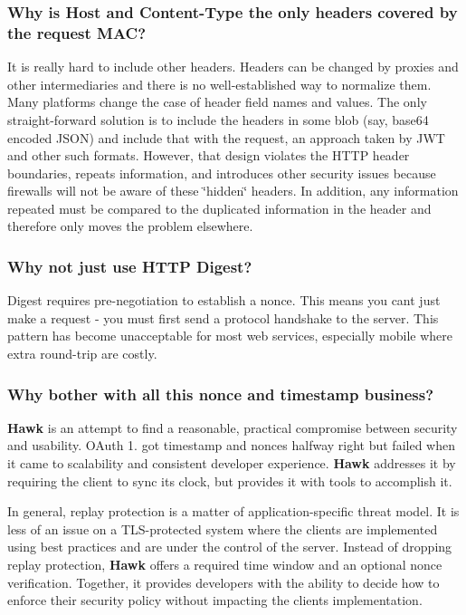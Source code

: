 \subsubsection*{Why is Host and Content-\/\+Type the only headers covered by the request M\+AC?}

It is really hard to include other headers. Headers can be changed by proxies and other intermediaries and there is no well-\/established way to normalize them. Many platforms change the case of header field names and values. The only straight-\/forward solution is to include the headers in some blob (say, base64 encoded J\+S\+ON) and include that with the request, an approach taken by J\+WT and other such formats. However, that design violates the H\+T\+TP header boundaries, repeats information, and introduces other security issues because firewalls will not be aware of these \char`\"{}hidden\char`\"{} headers. In addition, any information repeated must be compared to the duplicated information in the header and therefore only moves the problem elsewhere.

\subsubsection*{Why not just use H\+T\+TP Digest?}

Digest requires pre-\/negotiation to establish a nonce. This means you can\textquotesingle{}t just make a request -\/ you must first send a protocol handshake to the server. This pattern has become unacceptable for most web services, especially mobile where extra round-\/trip are costly.

\subsubsection*{Why bother with all this nonce and timestamp business?}

{\bfseries Hawk} is an attempt to find a reasonable, practical compromise between security and usability. O\+Auth 1. got timestamp and nonces halfway right but failed when it came to scalability and consistent developer experience. {\bfseries Hawk} addresses it by requiring the client to sync its clock, but provides it with tools to accomplish it.

In general, replay protection is a matter of application-\/specific threat model. It is less of an issue on a T\+L\+S-\/protected system where the clients are implemented using best practices and are under the control of the server. Instead of dropping replay protection, {\bfseries Hawk} offers a required time window and an optional nonce verification. Together, it provides developers with the ability to decide how to enforce their security policy without impacting the client\textquotesingle{}s implementation.

